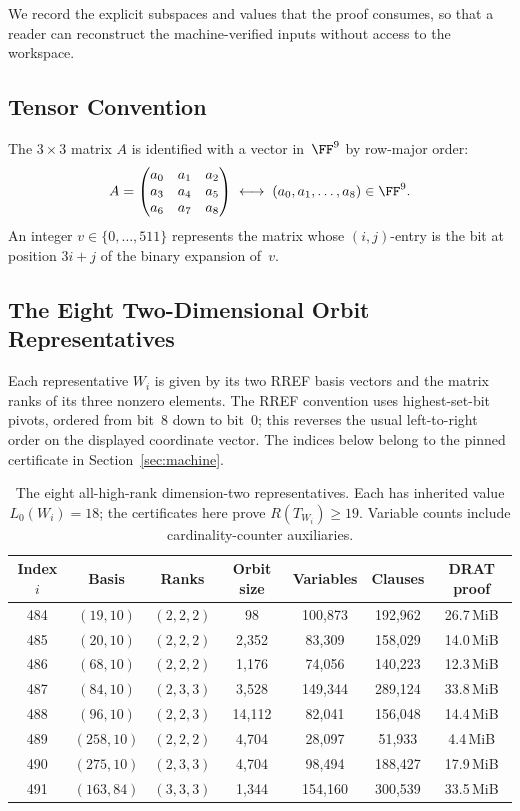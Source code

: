 \documentclass[11pt,a4paper]{article}
\begin{document}
We record the explicit subspaces and values that the proof consumes, so that a reader can reconstruct the machine-verified inputs without access to the workspace.

\subsection{Tensor Convention}

The $3\times 3$ matrix $A$ is identified with a vector in~$\FF^9$ by row-major order:
\[
  A = \begin{pmatrix} a_0 & a_1 & a_2 \\ a_3 & a_4 & a_5 \\ a_6 & a_7 & a_8 \end{pmatrix}
  \;\longleftrightarrow\; (a_0,a_1,\ldots,a_8)\in\FF^9.
\]
An integer $v\in\{0,\ldots,511\}$ represents the matrix whose $(i,j)$-entry is the bit at position $3i+j$ of the binary expansion of~$v$.

\subsection{The Eight Two-Dimensional Orbit Representatives}

Each representative $W_i$ is given by its two RREF basis vectors and the matrix ranks of its three nonzero elements. The RREF convention uses highest-set-bit pivots, ordered from bit~8 down to bit~0; this reverses the usual left-to-right order on the displayed coordinate vector. The indices below belong to the pinned certificate in Section~\ref{sec:machine}.

\begin{table}[H]
\centering
\caption{The eight all-high-rank dimension-two representatives. Each has inherited value $L_0(W_i)=18$; the certificates here prove $R(T_{W_i})\ge19$. Variable counts include cardinality-counter auxiliaries.}
\label{tab:dim2}
\begin{tabular}{ccccccc}
\toprule
Index $i$ & Basis & Ranks & Orbit size & Variables & Clauses & DRAT proof \\
\midrule
484 & $(19,10)$  & $(2,2,2)$ &    98 & 100{,}873 & 192{,}962 & 26.7\,MiB \\
485 & $(20,10)$  & $(2,2,2)$ & 2{,}352 &  83{,}309 & 158{,}029 & 14.0\,MiB \\
486 & $(68,10)$  & $(2,2,2)$ & 1{,}176 &  74{,}056 & 140{,}223 & 12.3\,MiB \\
487 & $(84,10)$  & $(2,3,3)$ & 3{,}528 & 149{,}344 & 289{,}124 & 33.8\,MiB \\
488 & $(96,10)$  & $(2,2,3)$ & 14{,}112 &  82{,}041 & 156{,}048 & 14.4\,MiB \\
489 & $(258,10)$ & $(2,2,2)$ & 4{,}704 &  28{,}097 &  51{,}933 &  4.4\,MiB \\
490 & $(275,10)$ & $(2,3,3)$ & 4{,}704 &  98{,}494 & 188{,}427 & 17.9\,MiB \\
491 & $(163,84)$ & $(3,3,3)$ & 1{,}344 & 154{,}160 & 300{,}539 & 33.5\,MiB \\
\bottomrule
\end{tabular}
\end{table}
\end{document}
